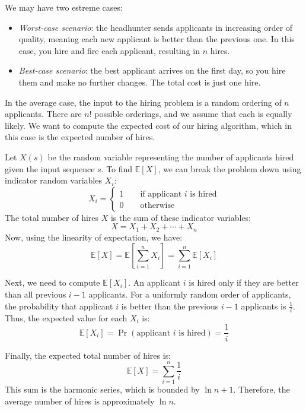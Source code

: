 We may have two estreme cases: 
\begin{itemize}
    \item \textit{Worst-case scenario}: the headhunter sends applicants in increasing order of quality, meaning each new applicant is better than the previous one. 
        In this case, you hire and fire each applicant, resulting in $n$ hires.
    \item \textit{Best-case scenario}: the best applicant arrives on the first day, so you hire them and make no further changes. 
        The total cost is just one hire.
\end{itemize}
In the average case, the input to the hiring problem is a random ordering of $n$ applicants. 
There are $n!$ possible orderings, and we assume that each is equally likely. 
We want to compute the expected cost of our hiring algorithm, which in this case is the expected number of hires.

Let $X(s)$ be the random variable representing the number of applicants hired given the input sequence $s$. 
To find $\mathbb{E}[X]$, we can break the problem down using indicator random variables $X_i$: 
\[X_i=\begin{cases} 1\qquad\text{if applicant }i\text{ is hired} \\ 0\qquad\text{otherwise} \end{cases}\]
The total number of hires $X$ is the sum of these indicator variables:
\[X=X_1+X_2+\cdots+X_n\]
Now, using the linearity of expectation, we have:
\[\mathbb{E}[X]=\mathbb{E}\left[\sum_{i=1}^n X_i\right]=\sum_{i=1}^n\mathbb{E}[X_i]\]

Next, we need to compute $\mathbb{E}[X_i]$. 
An applicant $i$ is hired only if they are better than all previous $i-1$ applicants.  
For a uniformly random order of applicants, the probability that applicant $i$ is better than the previous $i-1$ applicants is $\frac{1}{i}$.
Thus, the expected value for each $X_i$ is:
\[\mathbb{E}[X_i]=\Pr(\text{applicant }i\text{ is hired})=\dfrac{1}{i}\]

Finally, the expected total number of hires is:
\[\mathbb{E}[X]=\sum_{i=1}^n\dfrac{1}{i}\]
This sum is the harmonic series, which is bounded by $\ln n + 1$. 
Therefore, the average number of hires is approximately $\ln n$.

